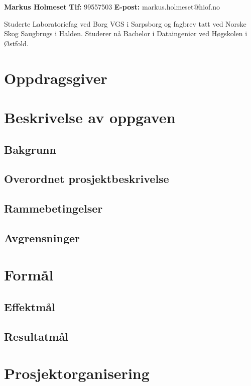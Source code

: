 \documentclass[norsk,a4paper,12pt]{article}
\begin{document}
\textbf{Markus Holmeset}\newline
\textbf{Tlf:} 99557503\newline
\textbf{E-post:} markus.holmeset@hiof.no\newline

Studerte Laboratoriefag ved Borg VGS i Sarpsborg og fagbrev tatt ved Norske Skog Saugbrugs i Halden. Studerer nå Bachelor i Dataingeniør ved Høgskolen i Østfold.


\section{Oppdragsgiver}

\section{Beskrivelse av oppgaven}

\subsection{Bakgrunn}

\subsection{Overordnet prosjektbeskrivelse}

\subsection{Rammebetingelser}

\subsection{Avgrensninger}

\section{Formål}

\subsection{Effektmål}

\subsection{Resultatmål}

\section{Prosjektorganisering}
\end{document}
